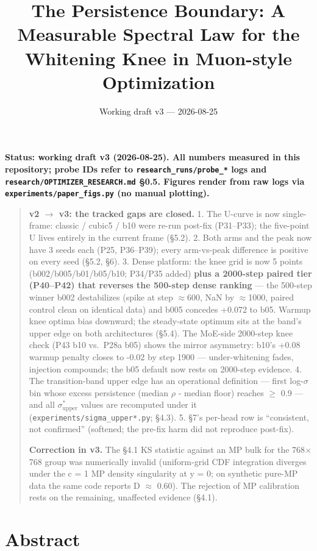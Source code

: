 \documentclass[
]{article}
\title{The Persistence Boundary: A Measurable Spectral Law for the
Whitening Knee in Muon-style Optimization}
\author{}
\date{Working draft v3 --- 2026-08-25}
\begin{document}
\maketitle

\textbf{Status: working draft v3 (2026-08-25). All numbers measured in
this repository; probe IDs refer to \texttt{research\_runs/probe\_*}
logs and \texttt{research/OPTIMIZER\_RESEARCH.md} §0.5. Figures render
from raw logs via \texttt{experiments/paper\_figs.py} (no manual
plotting).}

\begin{quote}
\textbf{v2 \(\to\) v3: the tracked gaps are closed.} 1. The U-curve is
now single-frame: classic / cubic5 / b10 were re-run post-fix
(P31--P33); the five-point U lives entirely in the current frame (§5.2).
2. Both arms and the peak now have 3 seeds each (P25, P36--P39); every
arm-vs-peak difference is positive on every seed (§5.2, §6). 3. Dense
platform: the knee grid is now 5 points (b002/b005/b01/b05/b10; P34/P35
added) \textbf{plus a 2000-step paired tier (P40--P42) that reverses the
500-step dense ranking} --- the 500-step winner b002 destabilizes (spike
at step \(\approx\){}600, NaN by \(\approx\){}1000, paired control
clean on identical data) and b005 concedes +0.072 to b05. Warmup knee
optima bias downward; the steady-state optimum sits at the band's upper
edge on both architectures (§5.4). The MoE-side 2000-step knee check
(P43 b10 vs.~P28a b05) shows the mirror asymmetry: b10's +0.08 warmup
penalty closes to -0.02 by step 1900 --- under-whitening fades,
injection compounds; the b05 default now rests on 2000-step evidence. 4.
The transition-band upper edge has an operational definition --- first
log-\(\sigma\) bin whose excess persistence (median \(\rho\) - median
floor) reaches \(\geq\) 0.9 --- and all \(\sigma^*_{\mathrm{upper}}\)
values are recomputed under it (\texttt{experiments/sigma\_upper*.py};
§4.3). 5. §7's per-head row is ``consistent, not confirmed'' (softened;
the pre-fix harm did not reproduce post-fix).

\textbf{Correction in v3.} The §4.1 KS statistic against an MP bulk for
the 768\(\times\){}768 group was numerically invalid (uniform-grid CDF
integration diverges under the c = 1 MP density singularity at y = 0; on
synthetic pure-MP data the same code reports D \(\approx\) 0.60). The
rejection of MP calibration rests on the remaining, unaffected evidence
(§4.1).
\end{quote}

\section{Abstract}\label{abstract}
\end{document}
